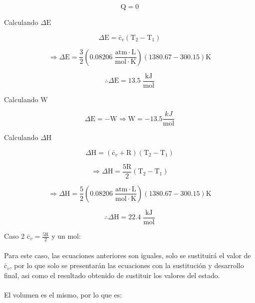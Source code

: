 \documentclass[12pt]{article}
\begin{document}
\begin{displaymath}
	\mathrm{Q}=0
\end{displaymath}

Calculando $\Delta\mathrm{E}$

\begin{displaymath}
	\Delta\mathrm{E}= \mathrm{\bar{c}}_v(\mathrm{T}_2-\mathrm{T}_1) 
\end{displaymath}

\begin{displaymath}
	\Rightarrow \Delta\mathrm{E}=\frac{3}{2}\left( 0.08206\; \frac{\mathrm{atm}\cdot\mathrm{L}}{\mathrm{mol}\cdot\mathrm{K}} \right)\left( 1380.67-300.15 \right)\mathrm{K}
\end{displaymath}

\begin{displaymath}
	\therefore\Delta\mathrm{E}=13.5\;\frac{\mathrm{kJ}}{\mathrm{mol}}
\end{displaymath}

Calculando $\mathrm{W}$

\begin{displaymath}
	\Delta\mathrm{E}=-\mathrm{W}\Rightarrow\mathrm{W}=-13.5\frac{kJ}{\mathrm{mol}}
\end{displaymath}

Calculando $\Delta\mathrm{H}$

\begin{displaymath}
	\Delta\mathrm{H}=(\mathrm{\bar{c}}_v+\mathrm{R})(\mathrm{T}_2-\mathrm{T}_1)
\end{displaymath}

\begin{displaymath}
	\Rightarrow\Delta\mathrm{H}=\frac{5\mathrm{R}}{2}(\mathrm{T}_2-\mathrm{T}_1)
\end{displaymath}

\begin{displaymath}
	\Rightarrow\Delta\mathrm{H}=\frac{5}{2}\left( 0.08206\; \frac{\mathrm{atm}\cdot\mathrm{L}}{\mathrm{mol}\cdot\mathrm{K}} \right)(1380.67-300.15)\mathrm{K}
\end{displaymath}

\begin{displaymath}
	\therefore\Delta\mathrm{H}=22.4\;\frac{\mathrm{kJ}}{\mathrm{mol}}
\end{displaymath}

Caso 2 $\mathrm{\bar{c}}_v=\frac{5\mathrm{R}}{2}$ y un mol:\\
\\
Para este caso, las ecuaciones anteriores son iguales, solo se sustituirá el valor de $\mathrm{\bar{c}}_v$, por lo que solo se presentarán las ecuaciones con la sustitución y desarrollo final, asi como el resultado obtenido de sustituir los valores del estado.\\
\\
El volumen es el mismo, por lo que es:
\end{document}
